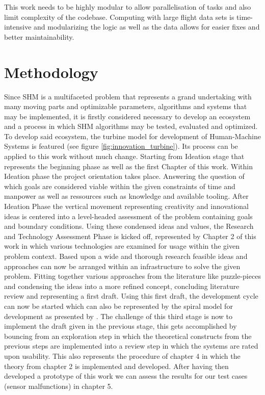 This work needs to be highly modular to allow parallelisation of tasks and also limit complexity of the codebase. Computing with large flight data sets is time-intensive and modularizing the logic as well as the data allows for easier fixes and better maintainability.

\section{Methodology}

Since SHM is a multifaceted problem that represents a grand undertaking with many moving parts and optimizable parameters, algorithms and systems that may be implemented, it is firstly considered necessary to develop an ecosystem and a process in which SHM algorithms may be tested, evaluated and optimized. To develop said ecosystem, the turbine model for development of Human-Machine Systems is featured (see figure \ref{fig:innovation_turbine}). Its process can be applied to this work without much change. Starting from Ideation stage that represents the beginning phase as well as the first Chapter of this work. Within Ideation phase the project orientation takes place. Answering the question of which goals are considered viable within the given constraints of time and manpower as well as ressources such as knowledge and available tooling.
After Ideation Phase the vertical movement representing creativity and innovational ideas is centered into a level-headed assessment of the problem containing goals and boundary conditions. Using these condensed ideas and values, the Research and Technology Assessment Phase is kicked off, represented by Chapter 2 of this work in which various technologies are examined for usage within the given problem context. Based upon a wide and thorough research feasible ideas and approaches can now be arranged within an infrastructure to solve the given problem. Fitting together various approaches from the literature like puzzle-pieces and condensing the ideas into a more refined concept, concluding literature review and representing a first draft. Using this first draft, the development cycle can now be started which can also be represented by the spiral model for development as presented by \textcite{boehm_spiral_1986}. The challenge of this third stage is now to implement the draft given in the previous stage, this gets accomplished by bouncing from an exploration step in which the theoretical constructs from the previous steps are implemented into a review step in which the systems are rated upon usability. This also represents the procedure of chapter 4 in which the theory from chapter 2 is implemented and developed. After having then developed a prototype of this work we can assess the results for our test cases (sensor malfunctions) in chapter 5.




